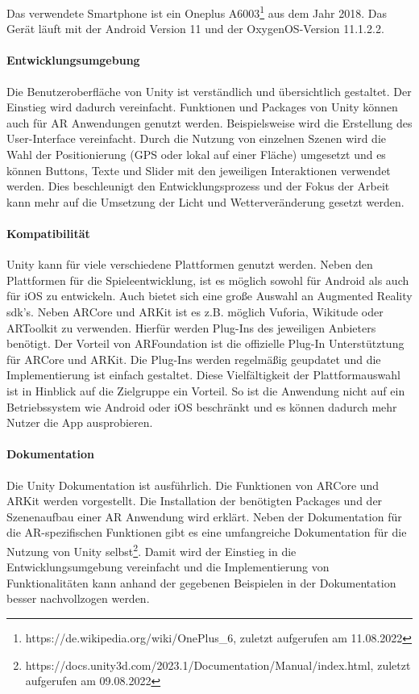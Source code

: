 Das verwendete Smartphone ist ein Oneplus A6003\footnote{https://de.wikipedia.org/wiki/OnePlus\_6, zuletzt aufgerufen am 11.08.2022} aus dem Jahr 2018. Das Gerät läuft mit der Android Version 11 und der OxygenOS-Version 11.1.2.2.

\paragraph*{Entwicklungsumgebung}
Die Benutzeroberfläche von Unity ist verständlich und übersichtlich gestaltet. Der Einstieg wird dadurch vereinfacht. Funktionen und Packages von Unity können auch für AR Anwendungen genutzt werden. Beispielsweise wird die Erstellung des User-Interface vereinfacht. Durch die Nutzung von einzelnen Szenen wird die Wahl der Positionierung (GPS oder lokal auf einer Fläche) umgesetzt und es können Buttons, Texte und Slider mit den jeweiligen Interaktionen verwendet werden. Dies beschleunigt den Entwicklungsprozess und der Fokus der Arbeit kann mehr auf die Umsetzung der Licht und Wetterveränderung gesetzt werden.

\paragraph*{Kompatibilität}
Unity kann für viele verschiedene Plattformen genutzt werden. Neben den Plattformen für die Spieleentwicklung, ist es möglich sowohl für Android als auch für iOS zu entwickeln. Auch bietet sich eine große Auswahl an Augmented Reality \acrshort{sdk}'s. Neben ARCore\cite*{ARCore} und ARKit\cite*{ARKit} ist es z.B. möglich Vuforia\cite*{Vuforia}, Wikitude\cite*{Wikitude} oder ARToolkit\cite{ARToolkit} zu verwenden. Hierfür werden Plug-Ins des jeweiligen Anbieters benötigt. Der Vorteil von ARFoundation ist die offizielle Plug-In Unterstütztung für ARCore und ARKit. Die Plug-Ins werden regelmäßig geupdatet und die Implementierung ist einfach gestaltet. Diese Vielfältigkeit der Plattformauswahl ist in Hinblick auf die Zielgruppe ein Vorteil. So ist die Anwendung nicht auf ein Betriebssystem wie Android oder iOS beschränkt und es können dadurch mehr Nutzer die App ausprobieren.

\paragraph*{Dokumentation}
Die Unity Dokumentation\cite*{UnityARFoundation} ist ausführlich. Die Funktionen von ARCore und ARKit werden vorgestellt. Die Installation der benötigten Packages und der Szenenaufbau einer AR Anwendung wird erklärt. Neben der Dokumentation für die AR-spezifischen Funktionen gibt es eine umfangreiche Dokumentation für die Nutzung von Unity selbst\footnote{https://docs.unity3d.com/2023.1/Documentation/Manual/index.html, zuletzt aufgerufen am 09.08.2022}. Damit wird der Einstieg in die Entwicklungsumgebung vereinfacht und die Implementierung von Funktionalitäten kann anhand der gegebenen Beispielen in der Dokumentation besser nachvollzogen werden.

